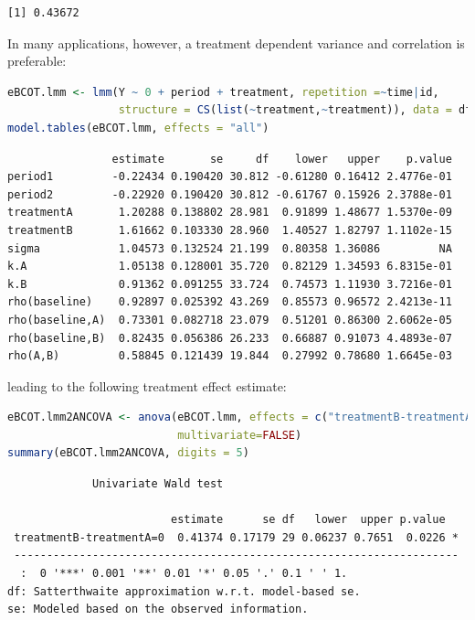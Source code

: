 \documentclass[12pt]{article}
\newcommand\Warning[1][3ex]{%
\renewcommand\stacktype{L}%
\scaleto{\stackon[1.3pt]{\color{red}$\triangle$}{\tiny\bfseries !}}{#1}%
\xspace
}
\begin{document}
\label{}
\begin{verbatim}
[1] 0.43672
\end{verbatim}


\Warning In many applications, however, a treatment dependent variance
and correlation is preferable:
\begin{lstlisting}[language=r,numbers=none]
eBCOT.lmm <- lmm(Y ~ 0 + period + treatment, repetition =~time|id,
                 structure = CS(list(~treatment,~treatment)), data = dfL.BCO)
model.tables(eBCOT.lmm, effects = "all")
\end{lstlisting}

\label{}
\begin{verbatim}
                estimate       se     df    lower   upper    p.value
period1         -0.22434 0.190420 30.812 -0.61280 0.16412 2.4776e-01
period2         -0.22920 0.190420 30.812 -0.61767 0.15926 2.3788e-01
treatmentA       1.20288 0.138802 28.981  0.91899 1.48677 1.5370e-09
treatmentB       1.61662 0.103330 28.960  1.40527 1.82797 1.1102e-15
sigma            1.04573 0.132524 21.199  0.80358 1.36086         NA
k.A              1.05138 0.128001 35.720  0.82129 1.34593 6.8315e-01
k.B              0.91362 0.091255 33.724  0.74573 1.11930 3.7216e-01
rho(baseline)    0.92897 0.025392 43.269  0.85573 0.96572 2.4213e-11
rho(baseline,A)  0.73301 0.082718 23.079  0.51201 0.86300 2.6062e-05
rho(baseline,B)  0.82435 0.056386 26.233  0.66887 0.91073 4.4893e-07
rho(A,B)         0.58845 0.121439 19.844  0.27992 0.78680 1.6645e-03
\end{verbatim}

leading to the following treatment effect estimate:
\begin{lstlisting}[language=r,numbers=none]
eBCOT.lmm2ANCOVA <- anova(eBCOT.lmm, effects = c("treatmentB-treatmentA=0"),
                          multivariate=FALSE)
summary(eBCOT.lmm2ANCOVA, digits = 5)
\end{lstlisting}

\label{}
\begin{verbatim}
             Univariate Wald test 

                         estimate      se df   lower  upper p.value  
 treatmentB-treatmentA=0  0.41374 0.17179 29 0.06237 0.7651  0.0226 *
 -------------------------------------------------------------------- 
  :  0 '***' 0.001 '**' 0.01 '*' 0.05 '.' 0.1 ' ' 1.
df: Satterthwaite approximation w.r.t. model-based se. 
se: Modeled based on the observed information.
\end{verbatim}
\end{document}

